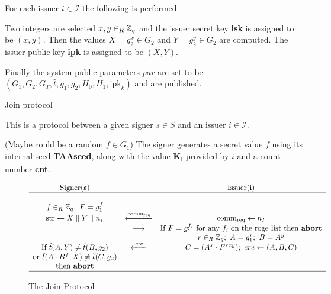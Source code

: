 For each issuer $i \in \mathcal{I}$ the following is performed.

Two integers are selected $x,y \in_R {\mathbb Z}_q$ and the issuer secret key \textbf{isk} is assigned to be $(x,y)$. Then the values $X = g_2^{x} \in G_2$ and $Y = g_2^{y} \in G_2$ are computed. The issuer public key \textbf{ipk} is assigned to be $(X,Y)$.

Finally the system public parameters $par$ are set to be $(G_1, G_2, G_T, \hat{t}, g_1, g_2, H_0, H_1, \text{ipk
}_k)$ and are published.

Join protocol

This is a protocol between a given signer $s \in S$  and an issuer $i \in \mathcal{I}$.


(Maybe could be a random $f \in G_1$)
The signer generates a secret value $f$ using its internal seed \textbf{TAAseed}, along with the value \textbf{K}\textsubscript{I} provided by $i$ and a count number \textbf{cnt}.

\begin{figure}[H]
$$
\begin{array}{ccc}
    \text{Signer}(\mathfrak{s}) &    & \text{Issuer}(\mathfrak{i}) \\
    \hline
    \\
    f \in_R {\mathbb Z}_q, \ F = g_1^f &    &    \\
    \text{str} \leftarrow X \parallel Y \parallel n_I &  \xleftarrow{\text{comm}_{\text{req}}} & \text{comm}_{\text{req}} \leftarrow n_I \\
        & \longrightarrow & \text{If } F = g_1^{f_i} \text{ for any } f_i \text{ on the roge list then \textbf{abort}} \\
        &        & r\in_R {\mathbb Z}_q; \ A = g_1^r; \ B = A^y \\
    \text{If } \hat{t}(A,Y) \neq \hat{t}(B,g_2) & \xleftarrow{\text{  cre  }} & C = (A^x \cdot F^{rxy}); \ cre \leftarrow(A,B,C) \\
    \text{or } \hat{t}(A \cdot B^f , X) \neq \hat{t}(C,g_2) &    & \\
    \text{then \textbf{abort}} &    & \\
    \hline
\end{array} 
$$
\caption{The Join Protocol}
\label{fig:join}
\end{figure}

